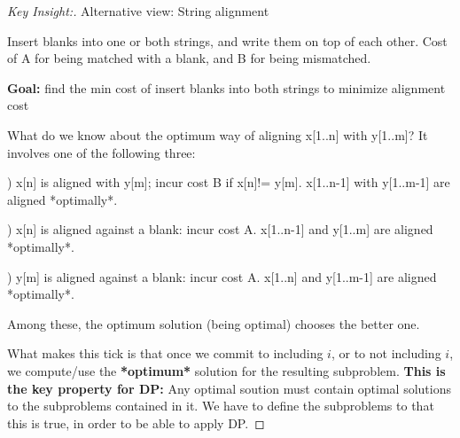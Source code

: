 \documentclass[openany]{article}
\begin{document}
\begin{proof}[Key Insight:]{}
		\renewcommand{\qedsymbol}{} %

        Alternative view: String alignment
        
        Insert blanks into one or both strings, and write them on top of each other. Cost of A for being matched with a blank, and B for being mismatched.

        \textbf{Goal:} find the min cost of insert blanks into both strings to minimize alignment cost

        What do we know about the optimum way of aligning x[1..n] with y[1..m]? It involves one of the following three:
        
        ) x[n] is aligned with y[m]; incur cost B if x[n]!= y[m]. x[1..n-1] with y[1..m-1] are aligned *optimally*.
        
        ) x[n] is aligned against a blank: incur cost A. x[1..n-1] and y[1..m] are aligned *optimally*.

        ) y[m] is aligned against a blank: incur cost A. x[1..n] and y[1..m-1] are aligned *optimally*.

        \qquad Among these, the optimum solution (being optimal) chooses the better one.

        What makes this tick is that once we commit to including $i$, or to not including $i$, we compute/use the \textbf{*optimum*} solution for the resulting subproblem. \textbf{This is the key property for DP:} Any optimal soution must contain optimal solutions to the subproblems contained in it. We have to define the subproblems to that this is true, in order to be able to apply DP.
\end{proof}
\end{document}
